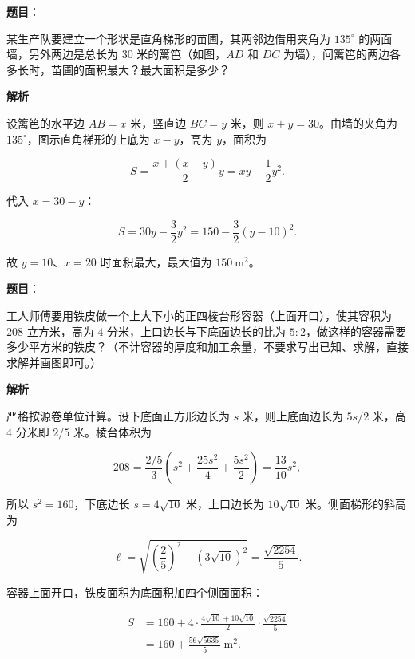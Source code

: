 \begin{answer}

\textbf{题目}：

某生产队要建立一个形状是直角梯形的苗圃，其两邻边借用夹角为 $135^\circ$ 的两面墙，另外两边是总长为 $30$ 米的篱笆（如图，$AD$ 和 $DC$ 为墙），问篱笆的两边各多长时，苗圃的面积最大？最大面积是多少？
\nopagebreak[4]
\begin{center}\end{center}
\nopagebreak[4]
\textbf{解析}

设篱笆的水平边 $AB=x$ 米，竖直边 $BC=y$ 米，则 $x+y=30$。由墙的夹角为 $135^\circ$，图示直角梯形的上底为 $x-y$，高为 $y$，面积为

\nopagebreak[4]
\[
S=\frac{x+(x-y)}2y=xy-\frac12y^2.
\]

代入 $x=30-y$：

\nopagebreak[4]
\[
S=30y-\frac32y^2=150-\frac32(y-10)^2.
\]

故 $y=10$、$x=20$ 时面积最大，最大值为 $150\ \mathrm{m^2}$。


\end{answer}
\begin{answer}

\textbf{题目}：

工人师傅要用铁皮做一个上大下小的正四棱台形容器（上面开口），使其容积为 $208$ 立方米，高为 $4$ 分米，上口边长与下底面边长的比为 $5:2$，做这样的容器需要多少平方米的铁皮？（不计容器的厚度和加工余量，不要求写出已知、求解，直接求解并画图即可。）

\textbf{解析}

严格按源卷单位计算。设下底面正方形边长为 $s$ 米，则上底面边长为 $5s/2$ 米，高 $4$ 分米即 $2/5$ 米。棱台体积为

\nopagebreak[4]
\[
208=\frac{2/5}{3}\left(s^2+\frac{25s^2}{4}+\frac{5s^2}{2}\right)=\frac{13}{10}s^2,
\]

所以 $s^2=160$，下底边长 $s=4\sqrt{10}$ 米，上口边长为 $10\sqrt{10}$ 米。侧面梯形的斜高为

\nopagebreak[4]
\[
\ell=\sqrt{\left(\frac25\right)^2+(3\sqrt{10})^2}=\frac{\sqrt{2254}}5.
\]

容器上面开口，铁皮面积为底面积加四个侧面面积：

\nopagebreak[4]
\[
\begin{aligned}
S&=160+4\cdot\frac{4\sqrt{10}+10\sqrt{10}}2\cdot\frac{\sqrt{2254}}5\\
&=160+\frac{56\sqrt{5635}}5\ \mathrm{m^2}.
\end{aligned}
\]


\end{answer}
